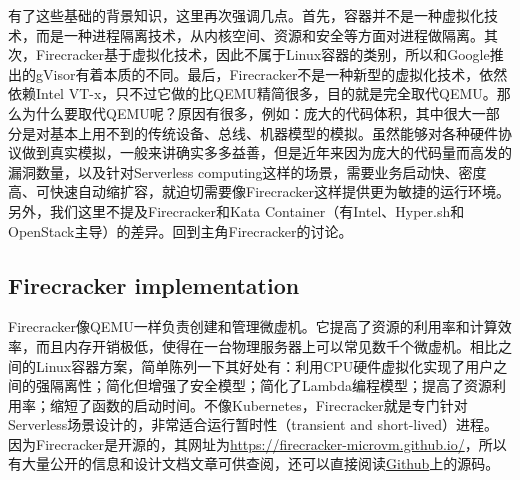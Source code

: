 \documentclass[11pt]{article}
\begin{document}
有了这些基础的背景知识，这里再次强调几点。首先，容器并不是一种虚拟化技术，而是一种进程隔离技术，从内核空间、资源和安全等方面对进程做隔离。其次，Firecracker基于虚拟化技术，因此不属于Linux容器的类别，所以和Google推出的gVisor有着本质的不同。最后，Firecracker不是一种新型的虚拟化技术，依然依赖Intel VT-x，只不过它做的比QEMU精简很多，目的就是完全取代QEMU。那么为什么要取代QEMU呢？原因有很多，例如：庞大的代码体积，其中很大一部分是对基本上用不到的传统设备、总线、机器模型的模拟。虽然能够对各种硬件协议做到真实模拟，一般来讲确实多多益善，但是近年来因为庞大的代码量而高发的漏洞数量，以及针对Serverless computing这样的场景，需要业务启动快、密度高、可快速自动缩扩容，就迫切需要像Firecracker这样提供更为敏捷的运行环境。另外，我们这里不提及Firecracker和Kata Container（有Intel、Hyper.sh和OpenStack主导）的差异。回到主角Firecracker的讨论。

\subsection{Firecracker implementation}
Firecracker像QEMU一样负责创建和管理微虚机。它提高了资源的利用率和计算效率，而且内存开销极低，使得在一台物理服务器上可以常见数千个微虚机。相比之间的Linux容器方案，简单陈列一下其好处有：利用CPU硬件虚拟化实现了用户之间的强隔离性；简化但增强了安全模型；简化了Lambda编程模型；提高了资源利用率；缩短了函数的启动时间。不像Kubernetes，Firecracker就是专门针对Serverless场景设计的，非常适合运行暂时性（transient and short-lived）进程。因为Firecracker是开源的，其网址为\url{https://firecracker-microvm.github.io/}，所以有大量公开的信息和设计文档文章可供查阅，还可以直接阅读\href{https://github.com/firecracker-microvm/firecracker}{Github}上的源码。
\end{document}
